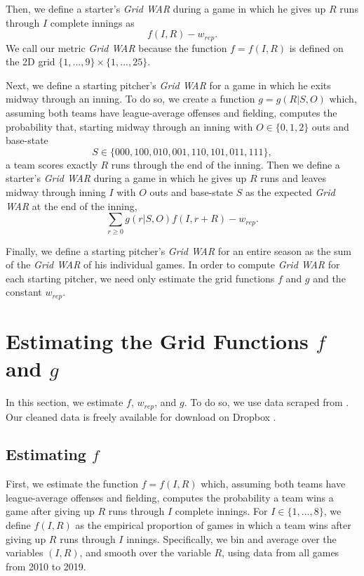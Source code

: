 \documentclass[12pt]{article}
\begin{document}
Then, we define a starter's \textit{Grid WAR} during a game in which he gives up $R$ runs through $I$ complete innings as 
\begin{equation}
f(I, R) - w_{rep}.
\label{eqn:war_f}
\end{equation}
We call our metric \textit{Grid WAR} because the function $f=f(I,R)$ is defined on the 2D grid $\{1,...,9\} \times \{1,...,25\}$.

Next, we define a starting pitcher's \textit{Grid WAR} for a game in which he exits midway through an inning. To do so, we create a function $g=g(R|S,O)$ which, assuming both teams have league-average offenses and fielding, computes the probability that, starting midway through an inning with $O \in \{0,1,2\}$ outs and base-state 
$$S \in \{000,100,010,001,110,101,011,111\},$$
a team scores exactly $R$ runs through the end of the inning. Then we define a starter's \textit{Grid WAR} during a game in which he gives up $R$ runs and leaves midway through inning $I$ with $O$ outs and base-state $S$ as the expected \textit{Grid WAR} at the end of the inning,
\begin{equation}
\sum_{r \geq 0} g(r|S,O) f(I,r+R) - w_{rep}.
\label{eqn:war_g}
\end{equation}

Finally, we define a starting pitcher's \textit{Grid WAR} for an entire season as the sum of the \textit{Grid WAR} of his individual games. In order to compute \textit{Grid WAR} for each starting pitcher, we need only estimate the grid functions $f$ and $g$ and the constant $w_{rep}$.

\section{Estimating the Grid Functions $f$ and $g$}

In this section, we estimate $f$, $w_{rep}$, and $g$. To do so, we use data scraped from \citet{retroRaw}. Our cleaned data is freely available for download on Dropbox \citep{dropboxRetrosheet}. 

\subsection{Estimating $f$}

First, we estimate the function $f=f(I,R)$ which, assuming both teams have league-average offenses and fielding, computes the probability a team wins a game after giving up $R$ runs through $I$ complete innings. For $I \in \{1,...,8\}$, we define $f(I,R)$ as the empirical proportion of games in which a team wins after giving up $R$ runs through $I$ innings. Specifically, we bin and average over the variables $(I,R)$, and smooth over the variable $R$, using data from all games from 2010 to 2019. 
\end{document}
